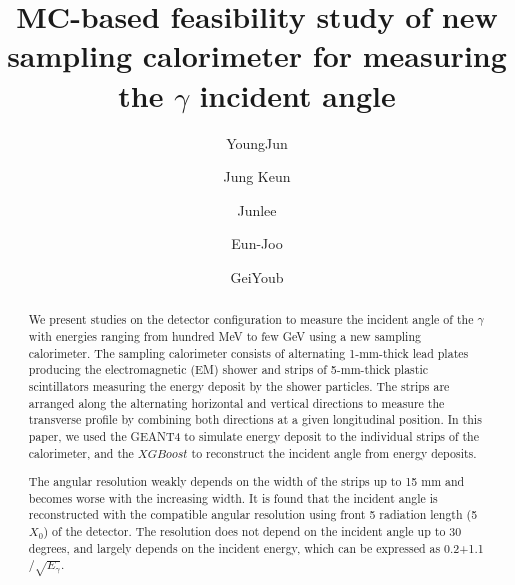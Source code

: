 \documentclass[jkps,preprint,fleqn,showpacs,showkeys]{revtex4}
\newcommand{\XGB}{XGBoost}
\begin{document}
\setcounter{page}{0}
\title[]{ MC-based feasibility study of new sampling calorimeter for measuring the $\gamma$ incident angle }

\author{YoungJun }
\author{Jung Keun }
\author{Junlee }
\author{Eun-Joo }
\author{GeiYoub  }


\begin{abstract}
We present studies on the detector configuration to measure the incident angle of the $\gamma$ with energies ranging from hundred MeV to few GeV using a new sampling calorimeter. The sampling calorimeter consists of alternating 1-mm-thick lead plates producing the electromagnetic (EM) shower and strips of 5-mm-thick plastic scintillators measuring the energy deposit by the shower particles. The strips are arranged along the alternating horizontal and vertical directions to measure the transverse profile by combining both directions at a given longitudinal position. In this paper, we used the GEANT4 to simulate energy deposit to the individual strips of the calorimeter, and the $\XGB$ to reconstruct the incident angle from energy deposits. 

The angular resolution weakly depends on the width of the strips up to 15 mm and becomes worse with the increasing width. It is found that the incident angle is reconstructed with the compatible angular resolution using front 5 radiation length (5$X_{0}$) of the detector. The resolution does not depend on the incident angle up to 30 degrees, and largely depends on the incident energy, which can be expressed as 0.2+1.1$/ \sqrt{E_\gamma}$.

\end{abstract}

\maketitle
\end{document}
